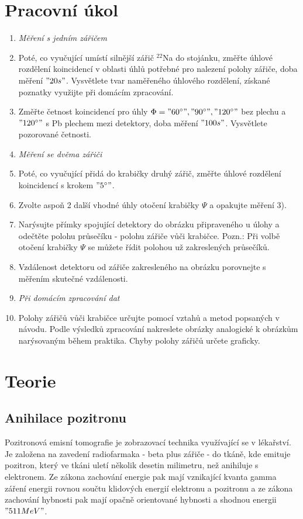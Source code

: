 \documentclass[10pt,a4paper]{article}
\begin{document}
\section*{Pracovní úkol}
\begin{enumerate}
\item[] {\it Měření s jedním zářičem}
\item Poté, co vyučující umístí silnější zářič $^{22}$Na do stojánku, změřte úhlové rozdělení koincidencí v oblasti úhlů potřebné pro nalezení polohy zářiče, doba měření $"20 s"$. Vysvětlete tvar naměřeného úhlového rozdělení, získané poznatky využijte při domácím zpracování.
\item Změřte četnost koincidencí pro úhly $\Phi = "60^\circ", "90^\circ", "120^\circ"$ bez plechu a $"120^\circ"$ s Pb plechem mezi detektory, doba měření $"100 s"$. Vysvětlete pozorované četnosti.
\item[] {\it Měření se dvěma zářiči}
\item Poté, co vyučující přidá do krabičky druhý zářič, změřte úhlové rozdělení koincidencí s krokem $"5^\circ"$.
\item Zvolte aspoň 2 další vhodné úhly otočení krabičky $\Psi$ a opakujte měření 3).
\item Narýsujte přímky spojující detektory do obrázku připraveného u úlohy a odečtěte polohu průsečíku - polohu zářiče vůči krabičce. Pozn.: Při volbě otočení krabičky $\Psi$ se můžete řídit polohou už zakreslených průsečíků.
\item Vzdálenost detektoru od zářiče zakresleného na obrázku porovnejte s měřením skutečné vzdálenosti.
\item[]{\it Při domácím zpracování dat}
\item Polohy zářičů vůči krabičce určujte pomocí vztahů a metod popsaných v návodu. Podle výsledků zpracování nakreslete obrázky analogické k obrázkům narýsovaným během praktika. Chyby polohy zářičů určete graficky.
\end{enumerate}
\section*{Teorie}
\subsection*{Anihilace pozitronu}
Pozitronová emisní tomografie je zobrazovací technika využívající se v lékařství. Je založena na zavedení radiofarmaka - beta plus zářiče - do tkáně, kde emituje pozitron, který ve tkáni uletí několik desetin milimetru, než anihiluje s elektronem. Ze zákona zachování energie pak mají vznikající kvanta gamma záření energii rovnou součtu klidových energií elektronu a pozitronu a ze zákona zachování hybnosti pak mají opačně orientované hybnosti a shodnou energii $"511 MeV"$.
\end{document}
